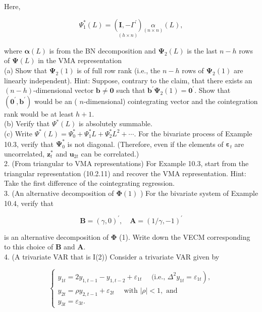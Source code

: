 \documentclass[10pt]{article}
\begin{document}
Here,


\begin{equation*}
\Psi_{1}^{*}(L)=\underset{(h \times n)}{\left(\mathbf{I},-\Gamma^{\prime}\right)} \underset{(n \times n)}{\alpha}(L), \tag{10.2.40}
\end{equation*}


where $\boldsymbol{\alpha}(L)$ is from the BN decomposition and $\boldsymbol{\Psi}_{2}(L)$ is the last $n-h$ rows of $\boldsymbol{\Psi}(L)$ in the VMA representation\\
(a) Show that $\boldsymbol{\Psi}_{2}(1)$ is of full row rank (i.e., the $n-h$ rows of $\boldsymbol{\Psi}_{2}(1)$ are linearly independent). Hint: Suppose, contrary to the claim, that there exists an $(n-h)$-dimensional vector $\mathbf{b} \neq \mathbf{0}$ such that $\mathbf{b}^{\prime} \boldsymbol{\Psi}_{2}(1)=\mathbf{0}^{\prime}$. Show that $\left(\mathbf{0}^{\prime}, \mathbf{b}^{\prime}\right)$ would be an ( $n$-dimensional) cointegrating vector and the cointegration rank would be at least $h+1$.\\
(b) Verify that $\Psi^{*}(L)$ is absolutely summable.\\
(c) Write $\Psi^{*}(L)=\Psi_{0}^{*}+\Psi_{1}^{*} L+\Psi_{2}^{*} L^{2}+\cdots$. For the bivariate process of Example 10.3, verify that $\boldsymbol{\Psi}_{0}^{*}$ is not diagonal. (Therefore, even if the elements of $\boldsymbol{\varepsilon}_{t}$ are uncorrelated, $\mathbf{z}_{t}^{*}$ and $\mathbf{u}_{2 t}$ can be correlated.)\\
2. (From triangular to VMA representations) For Example 10.3, start from the triangular representation (10.2.11) and recover the VMA representation. Hint: Take the first difference of the cointegrating regression.\\
3. (An alternative decomposition of $\boldsymbol{\Phi}(1)$ ) For the bivariate system of Example 10.4, verify that

$$
\mathbf{B}=(\gamma, 0)^{\prime}, \quad \mathbf{A}=(1 / \gamma,-1)^{\prime}
$$

is an alternative decomposition of $\boldsymbol{\Phi}$ (1). Write down the VECM corresponding to this choice of $\mathbf{B}$ and $\mathbf{A}$.\\
4. (A trivariate VAR that is I(2)) Consider a trivariate VAR given by

$$
\left\{\begin{array}{l}
\left.y_{1 t}=2 y_{1, t-1}-y_{1, t-2}+\varepsilon_{1 t} \quad \text { (i.e., } \Delta^{2} y_{1 t}=\varepsilon_{1 t}\right), \\
y_{2 t}=\rho y_{2, t-1}+\varepsilon_{2 t} \quad \text { with }|\rho|<1, \text { and } \\
y_{3 t}=\varepsilon_{3 t} .
\end{array}\right.
$$
\end{document}

